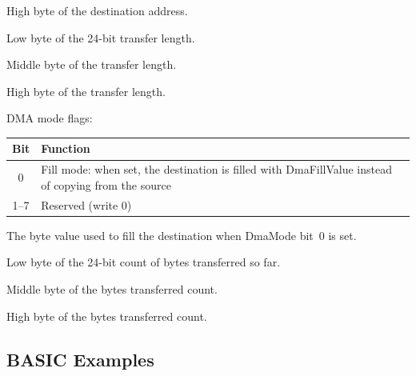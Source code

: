 High byte of the destination address.



Low byte of the 24-bit transfer length.


Middle byte of the transfer length.


High byte of the transfer length.



DMA mode flags:


\begin{center}
\small
\begin{tabular}{@{}cl@{}}
\toprule
\textbf{Bit} & \textbf{Function} \\
\midrule
0 & Fill mode: when set, the destination is filled with DmaFillValue
    instead of copying from the source \\
1--7 & Reserved (write 0) \\
\bottomrule
\end{tabular}
\end{center}



The byte value used to fill the destination when DmaMode bit~0 is set.



Low byte of the 24-bit count of bytes transferred so far.


Middle byte of the bytes transferred count.


High byte of the bytes transferred count.

\subsection{BASIC Examples}

